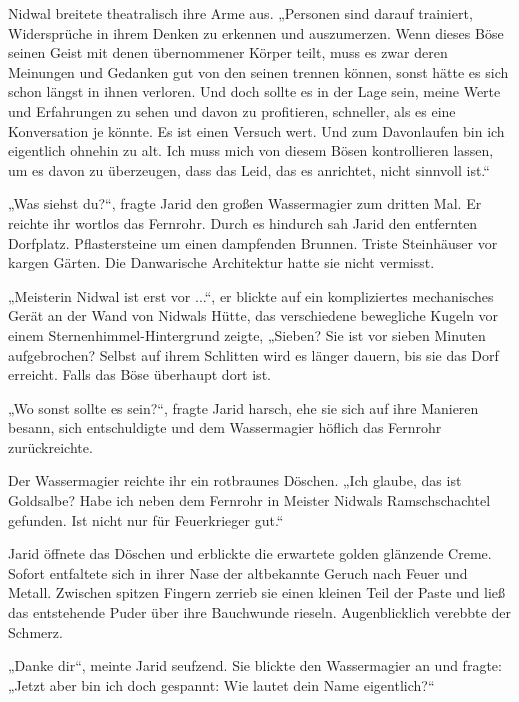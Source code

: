 Nidwal breitete theatralisch ihre Arme aus. „Personen sind darauf trainiert, Widersprüche in ihrem Denken zu erkennen und auszumerzen. Wenn dieses Böse seinen Geist mit denen übernommener Körper teilt, muss es zwar deren Meinungen und Gedanken gut von den seinen trennen können, sonst hätte es sich schon längst in ihnen verloren. Und doch sollte es in der Lage sein, meine Werte und Erfahrungen zu sehen und davon zu profitieren, schneller, als es eine Konversation je könnte. Es ist einen Versuch wert. Und zum Davonlaufen bin ich eigentlich ohnehin zu alt. Ich muss mich von diesem Bösen kontrollieren lassen, um es davon zu überzeugen, dass das Leid, das es anrichtet, nicht sinnvoll ist.“



\trennzeichen



„Was siehst du?“, fragte Jarid den großen Wassermagier zum dritten Mal. Er reichte ihr wortlos das Fernrohr. Durch es hindurch sah Jarid den entfernten Dorfplatz. Pflastersteine um einen dampfenden Brunnen. Triste Steinhäuser vor kargen Gärten. Die Danwarische Architektur hatte sie nicht vermisst.

„Meisterin Nidwal ist erst vor ...“, er blickte auf ein kompliziertes mechanisches Gerät an der Wand von Nidwals Hütte, das verschiedene bewegliche Kugeln vor einem Sternenhimmel-Hintergrund zeigte, „Sieben? Sie ist vor sieben Minuten aufgebrochen? Selbst auf ihrem Schlitten wird es länger dauern, bis sie das Dorf erreicht. Falls das Böse überhaupt dort ist.

„Wo sonst sollte es sein?“, fragte Jarid harsch, ehe sie sich auf ihre Manieren besann, sich entschuldigte und dem Wassermagier höflich das Fernrohr zurückreichte.

Der Wassermagier reichte ihr ein rotbraunes Döschen. „Ich glaube, das ist Goldsalbe? Habe ich neben dem Fernrohr in Meister Nidwals Ramschschachtel gefunden. Ist nicht nur für Feuerkrieger gut.“

Jarid öffnete das Döschen und erblickte die erwartete golden glänzende Creme. Sofort entfaltete sich in ihrer Nase der altbekannte Geruch nach Feuer und Metall. Zwischen spitzen Fingern zerrieb sie einen kleinen Teil der Paste und ließ das entstehende Puder über ihre Bauchwunde rieseln. Augenblicklich verebbte der Schmerz.

„Danke dir“, meinte Jarid seufzend. Sie blickte den Wassermagier an und fragte: „Jetzt aber bin ich doch gespannt: Wie lautet dein Name eigentlich?“

